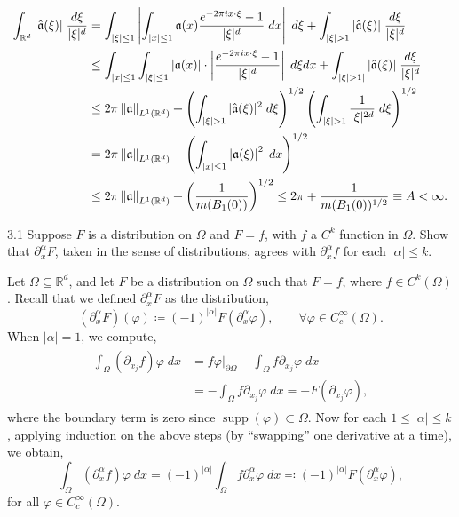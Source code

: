 \documentclass{article}
\begin{document}
\begin{align*}
	\begin{split}
		\int_{\mathbb{R}^{d}}|\hat{\mathfrak{a}}(\xi)|\;\frac{d\xi}{|\xi|^{d}} &= \int_{|\xi| \leq 1}\left| \int_{|x| \leq 1}\mathfrak{a}(x)\frac{e^{-2\pi i x \cdot \xi} - 1}{|\xi|^{d}}\;dx \right|\;d\xi + \int_{|\xi| > 1} |\hat{\mathfrak{a}}(\xi)|\;\frac{d\xi}{|\xi|^{d}} \\
		&\leq \int_{|x| \leq 1}\int_{|\xi| \leq 1}|\mathfrak{a}(x)| \cdot \left| \frac{e^{-2\pi i x \cdot \xi} - 1}{|\xi|^{d}} \right|\;d\xi dx + \int_{|\xi| > 1|}|\hat{\mathfrak{a}}(\xi)|\;\frac{d\xi}{|\xi|^{d}} \\
		&\leq 2\pi \left\Vert \mathfrak{a} \right\Vert_{L^{1}(\mathbb{R}^{d})} + \left(\int_{|\xi| > 1}|\hat{\mathfrak{a}}(\xi)|^{2}\;d\xi\right)^{1/2}\left(\int_{|\xi| > 1}\frac{1}{|\xi|^{2d}}\;d\xi\right)^{1/2} \\
		&= 2\pi \left\Vert \mathfrak{a} \right\Vert_{L^{1}(\mathbb{R}^{d})} + \left(\int_{|x|\leq 1}\left| \mathfrak{a}(\xi) \right|^{2}\;dx\right)^{1/2} \\
		&\leq 2\pi \left\Vert \mathfrak{a} \right\Vert_{L^{1}(\mathbb{R}^{d})} + \left(\frac{1}{m(B_{1}(0))}\right)^{1/2} \leq 2\pi + \frac{1}{m(B_{1}(0))^{1/2}} \equiv A < \infty. 
	\end{split} 
\end{align*} 


\begin{prb}{3.1}
	Suppose $F$ is a distribution on $\Omega$ and $F = f$, with $f$ a $C^{k}$ function in $\Omega$. Show that $\partial_{x}^{\alpha}F$, taken in the sense of distributions, agrees with $\partial_{x}^{\alpha}f$ for each $|\alpha|\leq k$. 
\end{prb}
Let $\Omega \subseteq \mathbb{R}^{d}$, and let $F$ be a distribution on $\Omega$ such that $F = f$, where $f \in C^{k}(\Omega)$. Recall that we defined $\partial_{x}^{\alpha}F$ as the distribution, 
\begin{equation*}
	(\partial_{x}^{\alpha}F)(\varphi) \coloneqq (-1)^{|\alpha|}F(\partial_{x}^{\alpha}\varphi), \qquad \forall \varphi \in C_{c}^{\infty}(\Omega). 
\end{equation*}
When $|\alpha| = 1$, we compute, 
\begin{align*}
	\begin{split}
		\int_{\Omega}(\partial_{x_{j}}f)\varphi\;dx &= f\varphi\bigg|_{\partial \Omega} - \int_{\Omega}f\partial_{x_{j}}\varphi\;dx  \\
		&= -\int_{\Omega}f\partial_{x_{j}}\varphi\;dx = -F(\partial_{x_{j}}\varphi), 
	\end{split}
\end{align*} 
where the boundary term is zero since $\operatorname{supp}(\varphi) \subset \Omega$. Now for each $1 \leq |\alpha| \leq k$, applying induction on the above steps (by ``swapping'' one derivative at a time), we obtain, 
\begin{equation*}
	\int_{\Omega}(\partial_{x}^{\alpha}f)\varphi\;dx = (-1)^{|\alpha|}\int_{\Omega}f\partial_{x}^{\alpha}\varphi\;dx  \eqqcolon (-1)^{|\alpha|}F(\partial_{x}^{\alpha}\varphi), 
\end{equation*}
for all $\varphi \in C_{c}^{\infty}(\Omega)$. 
\end{document}
